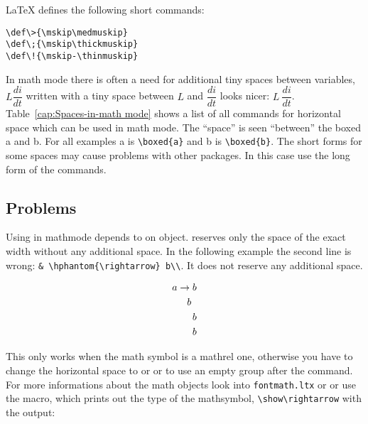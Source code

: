 \begin{table}[htb]
LaTeX defines the following short commands:

\begin{verbatim}
\def\>{\mskip\medmuskip}
\def\;{\mskip\thickmuskip}
\def\!{\mskip-\thinmuskip}
\end{verbatim}
In math mode there is often a need for additional tiny spaces between variables,
\eg $L\dfrac{di}{dt}$ written with a tiny space between $L$ and
$\dfrac{di}{dt}$ looks nicer: $L\:\dfrac{di}{dt}$. Table~\ref{cap:Spaces-in-math mode}
shows a list of all commands for horizontal space which can be used
in math mode. The ``space{}'' is seen ``between{}'' the boxed a
and b. For all examples a is \verb+\boxed{a}+ and
b is \verb+\boxed{b}+. The short forms for some
spaces may cause problems with other packages. In this case use the
long form of the commands.

\subsection{Problems}\label{space:problems}
Using  in mathmode depends to on object.  
reserves only the space of
the exact width without any additional space. In the following example the second line is
wrong: \verb+& \hphantom{\rightarrow} b\\+. It does not reserve any additional space.

\begin{LTXexample}[width=0.15\linewidth,wide]
\begin{align*}
a & \rightarrow b\\
  & \hphantom{\rightarrow} b\\
  & \mkern\thickmuskip\hphantom{\rightarrow}\mkern\thickmuskip b\\
  & \mathrel{\hphantom{\rightarrow}} b
\end{align*}
\end{LTXexample}

This only works when the math symbol is a mathrel one, otherwise you have to change the
horizontal space to  or  or to use an empty group after
the  command. For more informations
about the math objects look into \verb+fontmath.ltx+ or  or use the 
macro, which prints out the type of the mathsymbol, \eg \verb+\show\rightarrow+ with the
output:


\end{table}
